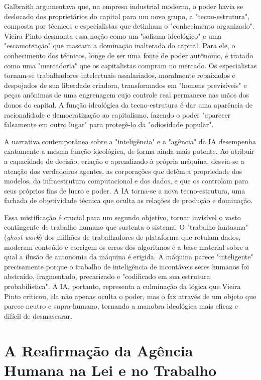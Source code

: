 Galbraith argumentava que, na empresa industrial moderna, o poder havia se deslocado dos proprietários do capital para um novo grupo, a "tecno-estrutura", composta por técnicos 
e especialistas que detinham o "conhecimento organizado". 
Vieira Pinto desmonta essa noção como um "sofisma ideológico" e uma "escamoteação" que mascara a dominação inalterada 
do capital. 
Para ele, o conhecimento dos técnicos, longe de ser uma fonte de poder autônomo, é tratado como uma "mercadoria" que os capitalistas compram no mercado.
Os 
especialistas tornam-se trabalhadores intelectuais assalariados, moralmente rebaixados e despojados de sua liberdade criadora, transformados em "homens previsíveis" e peças 
anônimas de uma engrenagem cujo controle real permanece nas mãos dos donos do capital. 
A função ideológica da tecno-estrutura é dar uma aparência de racionalidade e 
democratização ao capitalismo, fazendo o poder "aparecer falsamente em outro lugar" para protegê-lo da "odiosidade popular".

A narrativa contemporânea sobre a "inteligência" e a "agência" da IA desempenha exatamente a mesma função ideológica, de forma ainda mais potente. 
Ao atribuir a capacidade de 
decisão, criação e aprendizado à própria máquina, desvia-se a atenção dos verdadeiros agentes, as corporações que detêm a propriedade dos modelos, da infraestrutura 
computacional e dos dados, e que os controlam para seus próprios fins de lucro e poder. 
A IA torna-se a nova tecno-estrutura, uma fachada de objetividade técnica que oculta as 
relações de produção e dominação. 

Essa mistificação é crucial para um segundo objetivo, tornar invisível o vasto contingente de trabalho humano que sustenta o sistema.
O "trabalho fantasma" (\textit{ghost work}) \cite{GraySuri2019} 
dos milhões de trabalhadores de plataforma que rotulam dados, moderam conteúdo e corrigem os erros dos algoritmos é a base material sobre a qual a ilusão de autonomia da máquina 
é erigida. 
A máquina parece "inteligente" precisamente porque o trabalho de inteligência de incontáveis seres humanos foi abstraído, fragmentado, precarizado e "codificado em sua 
estrutura probabilística". 
A IA, portanto, representa a culminação da lógica que Vieira Pinto criticou, ela não apenas oculta o 
poder, mas o faz através de um objeto que parece 
neutro e supra-humano, tornando a manobra ideológica mais eficaz e difícil de desmascarar. 

\section{A Reafirmação da Agência Humana na Lei e no Trabalho}\label{sec:reafirmacao_agencia_humana}

